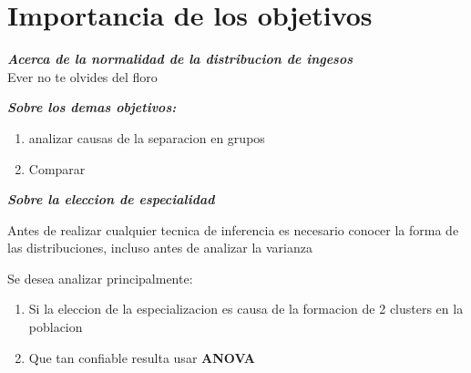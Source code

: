 \documentclass{beamer}
\begin{document}


\section{Importancia de los objetivos}

\begin{frame}
  \textbf{\textit{
    Acerca de la normalidad de la distribucion de ingesos
  }} \\
  \alert{Ever no te olvides del floro}
\end{frame}

\begin{frame}
  \textbf{\textit{
    Sobre los demas objetivos:
  }}
  \\

  \begin{enumerate}
      \item analizar causas de la separacion en grupos
      \item Comparar

  \end{enumerate}
\end{frame}

\begin{frame}
  \textit{\textbf{
    Sobre la eleccion de especialidad
  }}
  \newline

  Antes de realizar cualquier tecnica de inferencia es necesario conocer
  la forma de las distribuciones, incluso antes de analizar la varianza
  \newline

  Se desea analizar principalmente:

  \begin{enumerate}
      \item Si la eleccion de la especializacion es causa de la
        formacion de 2 clusters en la poblacion

      \item Que tan confiable resulta usar \textbf{ANOVA} \footnotemark
  \end{enumerate}



\end{frame}

\end{document}
